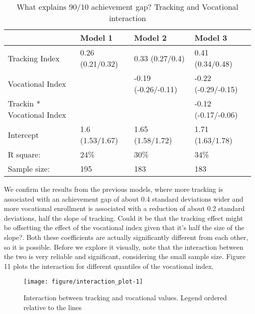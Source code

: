 \documentclass[11pt, a4paper]{article}\usepackage[]{graphicx}\usepackage[]{color}
\begin{document}
\begin{table}[ht]
\centering
\begin{tabular}{llll}
  \hline
  & Model 1 & Model 2 & Model 3 \\ 
  \hline
Tracking Index & 0.26 (0.21/0.32) & 0.33 (0.27/0.4) & 0.41 (0.34/0.48) \\ 
  Vocational Index &  & -0.19 (-0.26/-0.11) & -0.22 (-0.29/-0.15) \\ 
  Trackin * Vocational Index &  &  & -0.12 (-0.17/-0.06) \\ 
  Intercept & 1.6 (1.53/1.67) & 1.65 (1.58/1.72) & 1.71 (1.63/1.78) \\ 
   \hline R square: & 24\% & 30\% & 34\% \\ Sample size: & 195 & 183 & 183 \\ \hline \hline
\end{tabular}
\caption{What explains 90/10 achievement gap? Tracking and Vocational interaction} 
\end{table}


We confirm the results from the previous models, where more tracking is associated with an achievement gap of about 0.4 standard deviations wider and more vocational enrollment is associated with a reduction of about 0.2 standard deviations, half the slope of tracking. Could it be that the tracking effect might be offsetting the effect of the vocational index given that it's half the size of the slope?. Both these coefficients are actually significantly different from each other, so it is possible. Before we explore it visually, note that the interaction between the two is very reliable and significant, considering the small sample size. Figure 11 plots the interaction for different quantiles of the vocational index.



\begin{figure}

{\centering \texttt{[image: figure/interaction\_plot-1]} 

}

\caption[Interaction between tracking and vocational values]{Interaction between tracking and vocational values. Legend ordered relative to the lines}\label{fig:interaction_plot}
\end{figure}
\end{document}
